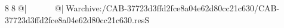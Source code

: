 8  8  @|                                                  @| W   archive:/CAB-37723d3ffd2fce8a04e62d80cc21c630/CAB-37723d3ffd2fce8a04e62d80cc21c630.resS 
